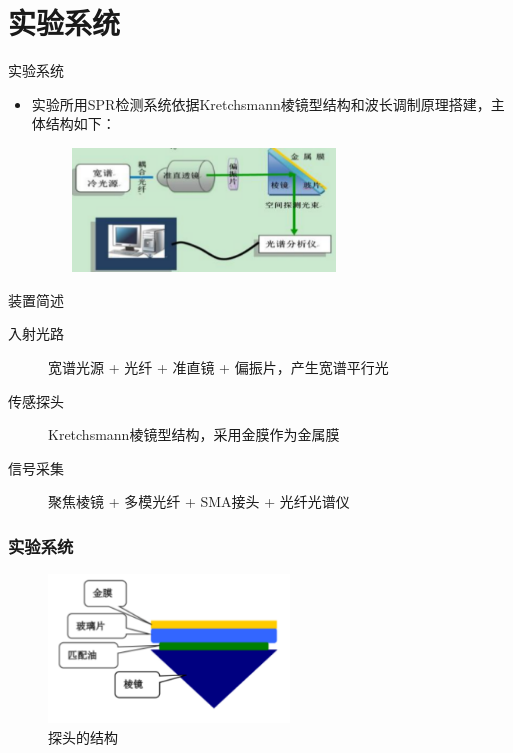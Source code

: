 \documentclass{beamer}
\begin{document}
\section{实验系统}
\begin{frame}{实验系统}
  \begin{itemize}
    \item 实验所用SPR检测系统依据Kretchsmann棱镜型结构和波长调制原理搭建，主体结构如下：
    \begin{figure}
      \includegraphics[height=3.29cm,width=7cm]{images/2_3.png}
    \end{figure}
  \end{itemize}
  

\begin{block}{装置简述}
  \begin{description}
    \item[入射光路] 宽谱光源 + 光纤 + 准直镜 + 偏振片，产生宽谱平行光
    \item[传感探头] Kretchsmann棱镜型结构，采用金膜作为金属膜
    \item[信号采集] 聚焦棱镜 + 多模光纤 + SMA接头 + 光纤光谱仪
  \end{description}
\end{block}
  
\end{frame}
\begin{frame}
  \frametitle{实验系统}
  \begin{figure}
    \includegraphics[height=3.94cm,width=6.4cm]{images/2_4.png}
    \caption{探头的结构}
  \end{figure}
\end{frame}
\end{document}
